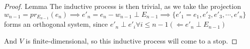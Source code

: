 \begin{proof} {Lemma}
    The inductive process is then trivial, as we take the projection \(w_{n-1} = pr_{E_{n-1}} (e_n) \implies e'_n = e_n - w_{n-1} \perp E_{n-1} \implies \{e'_1  = e_1, e'_2, e'_3, \cdots, e'_n\}\) forms an orthogonal system, since \(e'_n \perp e'_i \forall i \leq n-1 (\Leftarrow e'_n \perp E_{n-1})\)

    And \(V\) is finite-dimensional, so this inductive process will come to a stop.
\end{proof}


